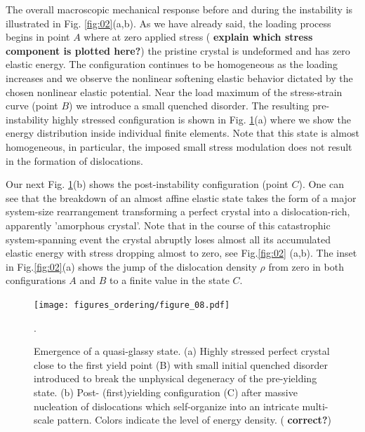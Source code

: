\documentclass[aps,
superscriptaddress,notitlepage]{revtex4-1}
\begin{document}
  The overall macroscopic mechanical response before and during the instability is illustrated in Fig. \ref{fig:02}(a,b). As we have already said, the loading process begins in point $A$ where at zero applied stress (\textbf{ explain which stress component is plotted  here?}) the pristine crystal is undeformed and has zero elastic energy. The configuration continues to be homogeneous as the loading increases and we observe the nonlinear softening elastic behavior dictated by the chosen nonlinear elastic potential. Near the load maximum of the stress-strain curve (point $B$) we introduce a small quenched disorder. The resulting pre-instability  highly stressed  configuration  is shown in Fig.  \ref{fig:22}(a) where we show the energy distribution inside  individual  finite elements.  Note that this state is almost homogeneous, in particular, the imposed small stress modulation does not result in the formation of dislocations. 
  
   
Our next Fig.  \ref{fig:22}(b)  shows the post-instability configuration  (point $C$). One can see that   the breakdown of an   almost  aﬃne elastic state  takes the form of a major  system-size  rearrangement transforming a perfect crystal into a dislocation-rich, apparently 'amorphous crystal'. Note that in the course of this  catastrophic  system-spanning event  the crystal   abruptly loses almost all its  accumulated elastic energy with stress   dropping almost to zero, see Fig.\ref{fig:02} (a,b).   The inset in  Fig.\ref{fig:02}(a) shows the jump of the dislocation density $\rho$ from zero in both configurations $A$ and $B$ to a finite value in the state $C$.  
\begin{figure}[ht!]
\centering
\texttt{[image: figures\_ordering/figure\_08.pdf]}
\caption{Emergence of a quasi-glassy state.  (a) Highly stressed perfect crystal close to the first yield point (B) with small  initial quenched disorder introduced to break the unphysical degeneracy of the pre-yielding state.  (b) Post- (first)yielding   configuration (C) after   massive nucleation of  dislocations which self-organize into an intricate multi-scale   pattern. Colors indicate the level of energy density. ( \textbf{correct?})}. 
\label{fig:22}
\end{figure}
  
\end{document}
